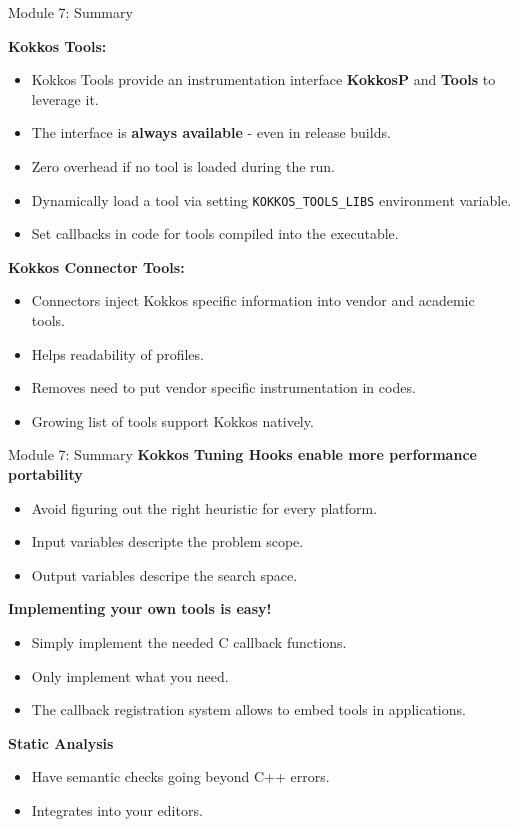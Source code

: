 \begin{frame}[fragile]{Module 7: Summary}

\textbf{Kokkos Tools:}
\begin{itemize}
  \item Kokkos Tools provide an instrumentation interface \textbf{KokkosP} and \textbf{Tools} to leverage it.
  \item The interface is \textbf{always available} - even in release builds.
  \item Zero overhead if no tool is loaded during the run.
  \item Dynamically load a tool via setting \texttt{KOKKOS\_TOOLS\_LIBS} environment variable.
  \item Set callbacks in code for tools compiled into the executable. 
\end{itemize}

\textbf{Kokkos Connector Tools:}
\begin{itemize}
  \item Connectors inject Kokkos specific information into vendor and academic tools.
  \item Helps readability of profiles.
  \item Removes need to put vendor specific instrumentation in codes.
  \item Growing list of tools support Kokkos natively.
\end{itemize}
\end{frame}

\begin{frame}[fragile]{Module 7: Summary}
\textbf{Kokkos Tuning Hooks enable more performance portability}
\begin{itemize}
  \item Avoid figuring out the right heuristic for every platform.
  \item Input variables descripte the problem scope.
  \item Output variables descripe the search space.
\end{itemize}

\textbf{Implementing your own tools is easy!}
\begin{itemize}
  \item Simply implement the needed C callback functions.
  \item Only implement what you need.
  \item The callback registration system allows to embed tools in applications.
\end{itemize}

\textbf{Static Analysis}
\begin{itemize}
  \item Have semantic checks going beyond C++ errors.
  \item Integrates into your editors.
\end{itemize}
\end{frame}

